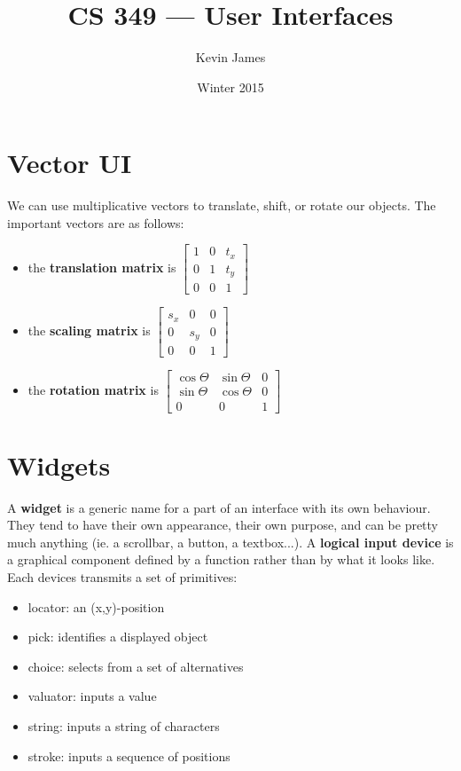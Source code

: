 \documentclass[12pt]{article}
\begin{document}
\title{CS 349 --- User Interfaces}
\author{Kevin James}
\date{\vspace{-2ex}Winter 2015}
\maketitle\HRule

\tableofcontents
\newpage

\section{Vector UI}
We can use multiplicative vectors to translate, shift, or rotate our objects. The important vectors are as follows:
\begin{itemize}
\item the {\bf translation matrix} is $\begin{bmatrix}1 & 0 & t_x \\ 0 & 1 & t_y \\ 0 & 0 & 1 \end{bmatrix}$
\item the {\bf scaling matrix} is $\begin{bmatrix}s_x & 0 & 0 \\ 0 & s_y & 0 \\ 0 & 0 & 1 \end{bmatrix}$
\item the {\bf rotation matrix} is $\begin{bmatrix}\cos\Theta & \sin\Theta & 0 \\ \sin\Theta & \cos\Theta & 0 \\ 0 & 0 & 1 \end{bmatrix}$
\end{itemize}

\section{Widgets}
A {\bf widget} is a generic name for a part of an interface with its own behaviour. They tend to have their own appearance, their own purpose, and can be pretty much anything (ie. a scrollbar, a button, a textbox...). A {\bf logical input device} is a graphical component defined by a function rather than by what it looks like. Each devices transmits a set of primitives:
\begin{itemize}
\item locator: an (x,y)-position
\item pick: identifies a displayed object
\item choice: selects from a set of alternatives
\item valuator: inputs a value
\item string: inputs a string of characters
\item stroke: inputs a sequence of positions
\end{itemize}
\end{document}
